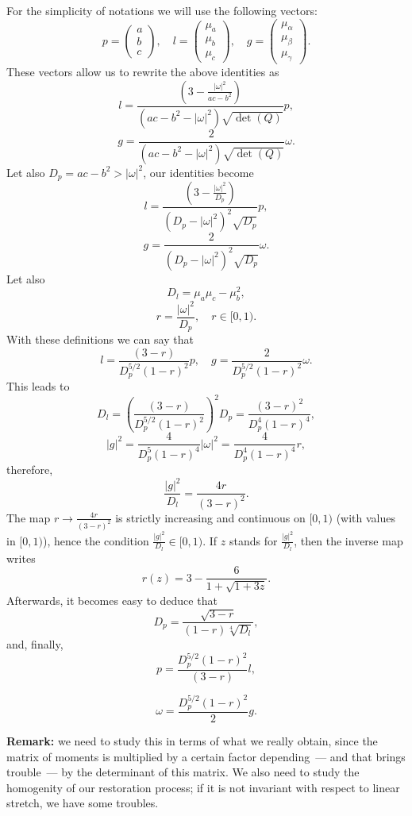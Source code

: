 For the simplicity of notations we will use the following vectors:
\[
    p = \begin{pmatrix}
        a\\b\\c
    \end{pmatrix},
    \quad
    l = \begin{pmatrix}
        \mu_a\\\mu_b\\\mu_c
    \end{pmatrix},
    \quad 
    g = \begin{pmatrix}
        \mu_{\alpha}\\\mu_{\beta}\\\mu_{\gamma}
    \end{pmatrix}.
\]
These vectors allow us to rewrite the above identities as
\[
    l = \frac{  \left(3-\frac{|\omega|^2}{ac-b^2}\right)}
    {(ac-b^2-|\omega|^2)\sqrt {\det(Q)}}p,
\]
\[
    g =  \frac{2 }{(ac-b^2-|\omega|^2)\sqrt {\det(Q)}}\omega.
\]
Let also $D_p=ac-b^2>|\omega|^2$, our identities become
\[
    l = \frac{  \left(3-\frac{|\omega|^2}{D_p}\right)}{(D_p-|\omega|^2)^2\sqrt { D_p}}p,
\]
\[
    g =  \frac{2 }{(D_p-|\omega|^2)^2\sqrt { D_p}}\omega.
\]
Let also 
\[
    D_l = \mu_a \mu_c- \mu_b^2,
\]
\[
    r = \frac{|\omega|^2}{D_p},\quad  r\in[0,1) .
\]
With these definitions we can say that
\[
    l = \frac{ (3-r )}{D_p^{5/2}(1-r)^2}p,
    \quad g = \frac{2 }{D_p^{5/2}(1-r)^2}\omega.
\]
This leads to
\[
    D_l = \left( \frac{ (3-r )} {D_p^{5/2}(1-r)^2}\right)^2 D_p = 
       \frac{ (3-r )^2} {D_p^{4}(1-r)^4}, 
\]
\[
    |g|^2 = \frac{4 }{D_p^{5 }(1-r)^4}|\omega|^2 =
    \frac{4 }{D_p^{4 }(1-r)^4}r,
\]
therefore,
\[
    \frac{|g|^2}{D_l}=\frac{4r}{(3-r )^2}.
\]
The map $r\to\frac{4r}{(3-r )^2} $ is strictly increasing and continuous on $[0,1)$ (with values in $[0,1)$), hence the condition $ \frac{|g|^2}{D_l}\in[0,1)$. If $z$ stands for $\frac{|g|^2}{D_l}$, then the inverse map writes
\[
    r(z)=3 - \frac{6}{1+\sqrt{1+3z}}.
\]
Afterwards, it becomes easy to deduce that
\[
    D_p = \frac{\sqrt{3-r}}{(1-r)\sqrt[4]{D_l}},
\]
and, finally,
\[
    p = \frac{D_p^{5/2}(1-r)^2}{ (3-r )}l,
\]

\[
    \omega = \frac{D_p^{5/2}(1-r)^2}{2 }g.
\]


\textbf{Remark:} we need to study this in terms of what we really obtain, since the matrix of moments is multiplied by a certain factor depending~--- and that brings trouble~--- by the determinant of this matrix. We also need to study the homogenity of our restoration process; if it is not invariant with respect to linear stretch, we have some troubles.

